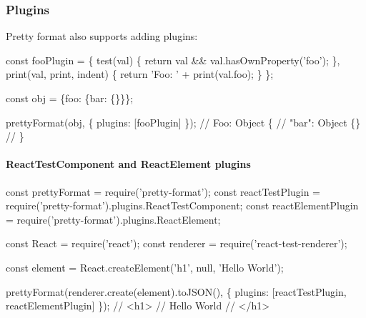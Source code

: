\subsubsection*{Plugins}

Pretty format also supports adding plugins\+:


\begin{DoxyCode}
const fooPlugin = \{
  test(val) \{
    return val && val.hasOwnProperty('foo');
  \},
  print(val, print, indent) \{
    return 'Foo: ' + print(val.foo);
  \}
\};

const obj = \{foo: \{bar: \{\}\}\};

prettyFormat(obj, \{
  plugins: [fooPlugin]
\});
// Foo: Object \{
//   "bar": Object \{\}
// \}
\end{DoxyCode}


\paragraph*{{\ttfamily React\+Test\+Component} and {\ttfamily React\+Element} plugins}


\begin{DoxyCode}
const prettyFormat = require('pretty-format');
const reactTestPlugin = require('pretty-format').plugins.ReactTestComponent;
const reactElementPlugin = require('pretty-format').plugins.ReactElement;

const React = require('react');
const renderer = require('react-test-renderer');

const element = React.createElement('h1', null, 'Hello World');

prettyFormat(renderer.create(element).toJSON(), \{
  plugins: [reactTestPlugin, reactElementPlugin]
\});
// <h1>
//   Hello World
// </h1>
\end{DoxyCode}
 